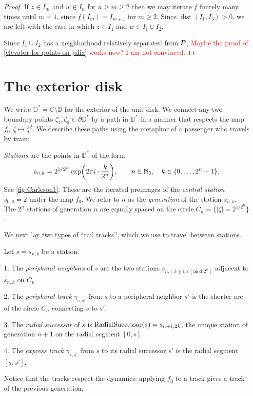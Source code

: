 \begin{proof}
    If $z \in I_m$ and $w \in I_n$ for $n \geq m \geq 2$ then we may iterate $f$ finitely many times until $m=1$, since $f(I_m)=I_{m+1}$ for $m \geq 2$.
    Since $\operatorname{dist}(I_1,I_3)>0$, we are left with the case in which $z \in I_1$ and $w \in I_1\cup I_2$.

    Since $I_1\cup I_2$ has a neighborhood relatively separated from $\operatorname{\mathcal P}$, 
    \textcolor{red}{Maybe the proof of \cref{elevator for points on julia} works now? I am not convinced.}
\end{proof}

\section{The exterior disk}

We write $\mathbb D^* = \mathbb{C} \setminus \mathbb{D}$ for the exterior of the unit disk. We connect any two boundary points $\zeta_1, \zeta_2 \in \partial \mathbb D^*$ by a path in $\mathbb D^*$ in a manner that respects the map 
$f_0: \zeta \mapsto \zeta^2$.
We describe these paths using the metaphor of a passenger who travels by train:

\begin{definition}
\emph{Stations} are the points in $\mathbb D ^*$ of the form 
$$
s_{n,k}=2^{1/2^{n}} \exp \biggl (2\pi i \cdot \frac{k}{2^{n}} \biggr),\qquad n\in\mathbb{N}_{0},\quad k\in \{ 0,\ldots,2^{n}-1 \}.
$$ 
 See \cref{fig:Carleson1}. These are the iterated preimages of the \emph{central station} $s_{0,0} = 2$ under the map $f_{0}$.
We refer to $n$ as the \emph{generation} of the station $s_{n,k}$. 
The $2^{n}$ stations of generation $n$ are equally spaced on the circle $C_{n}=\bigl \{ |\zeta|=2^{1/2^{n}} \bigr \} $. 
\end{definition}

We next lay two types of \enquote{rail tracks}, which we use to travel between stations.

\begin{definition}
Let $s=s_{n,k}$ be a station.

1. The \emph{peripheral neighbors} of $s$ are the two stations $s_{n, (k\pm1) (\mathrm{mod}\; 2^{n})}$ adjacent to $s_{n,k}$ on $C_{n}$.

2. The \emph{peripheral track }$\gamma_{s,s'}$ from $s$ to a peripheral neighbor $s'$
is the shorter arc of the circle $C_{n}$ connecting $s$ to $s'$.

3. The \emph{radial successor} of $s$ is $\operatorname{RadialSuccessor}(s)=s_{n+1,2k}$, the unique station of generation $n+1$ on the radial segment $[0,s]$.

4. The \emph{express track} $\gamma_{s,s'}$ from $s$ to its radial successor $s'$ is the radial segment $[s,s']$.
\end{definition}
Notice that the tracks respect the dynamics: applying $f_0$ to a track gives a track of the previous generation.

